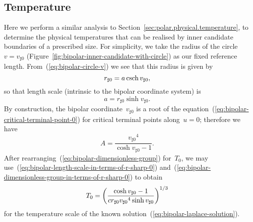 \begin{figure}
\end{figure}

\subsection{Temperature}
\label{sec:bipolar.physical.temperature}

Here we perform a similar analysis
to Section~\ref{sec:polar.physical.temperature},
to determine the physical temperatures that can be realised
by inner candidate boundaries of a prescribed size.
For simplicity,
we take the radius of the circle~$v = v_{\sharp 0}$
(Figure~\ref{fig:bipolar-inner-candidate-with-circle})
as our fixed reference length.
From~(\ref{eq:bipolar-circle-v})
we see that this radius is given by
\begin{equation}
  r_{\sharp 0} = a \csch v_{\sharp 0},
  \label{eq:bipolar-r-sharp-0}
\end{equation}
so that length scale (intrinsic to the bipolar coordinate system) is
\begin{equation}
  a = r_{\sharp 0} \sinh v_{\sharp 0}.
  \label{eq:bipolar-length-scale-in-terms-of-r-sharp-0}
\end{equation}
By construction, the bipolar coordinate~$v_{\sharp 0}$
is a root of the equation~(\ref{eq:bipolar-critical-terminal-point-0})
for critical terminal points along~$u = 0$;
therefore we have
\begin{equation}
  A = \frac{{v_{\sharp 0}}^4}{\cosh v_{\sharp 0} - 1}.
  \label{eq:bipolar-dimensionless-group-in-terms-of-r-sharp-0}
\end{equation}
After rearranging~(\ref{eq:bipolar-dimensionless-group}) for~$T_0$,
we may use~(\ref{eq:bipolar-length-scale-in-terms-of-r-sharp-0})
and~(\ref{eq:bipolar-dimensionless-group-in-terms-of-r-sharp-0})
to obtain
\begin{equation}
  T_0 =
    \roundbr*{
      \frac{
        \cosh v_{\sharp 0} - 1
      }{
        c r_{\sharp 0} {v_{\sharp 0}}^4 \sinh v_{\sharp 0}
      }
    }^{1/3}
  \label{eq:bipolar-temperature-scale-in-terms-of-r-sharp-0}
\end{equation}
for the temperature scale
of the known solution~(\ref{eq:bipolar-laplace-solution}).
